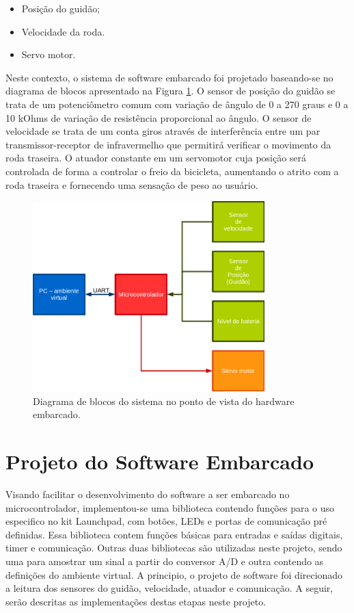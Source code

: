 \begin {itemize}
	\item Posição do guidão;
	\item Velocidade da roda.
	\item Servo motor.
\end  {itemize}

Neste contexto, o sistema de software embarcado foi projetado baseando-se no diagrama de blocos apresentado na Figura \ref{blocos}. O sensor de posição do guidão se trata de um potenciômetro comum com variação de ângulo de 0 a 270 graus e 0 a 10 kOhms de variação de resistência proporcional ao ângulo. O sensor de velocidade se trata de um conta giros através de interferência entre um par transmissor-receptor de infravermelho que permitirá verificar o movimento da roda traseira. O atuador constante em um servomotor cuja posição será controlada de forma a controlar o freio da bicicleta, aumentando o atrito com a roda traseira e fornecendo uma sensação de peso ao usuário.

\begin{figure}[h]
  \centering
  \includegraphics[width=0.8\textwidth]
      {figuras/diag_blocos_elet1.png}
  \caption{Diagrama de blocos do sistema no ponto de vista do hardware embarcado.}
  \label{blocos}
\end{figure}

\section{Projeto do Software Embarcado} %
\label{sec:soft_emb}
Visando facilitar o desenvolvimento do software a ser embarcado no microcontrolador, implementou-se uma biblioteca contendo funções para o uso especifico no kit Launchpad, com botões, LEDs e portas de comunicação pré definidas. Essa biblioteca contem funções básicas para entradas e saídas digitais, timer e comunicação. Outras duas bibliotecas são utilizadas neste projeto, sendo uma para amostrar um sinal a partir do conversor A/D e outra contendo as definições do ambiente virtual.
A principio, o projeto de software foi direcionado a leitura dos sensores do guidão, velocidade, atuador e comunicação. A seguir, serão descritas as implementações destas etapas neste projeto.


